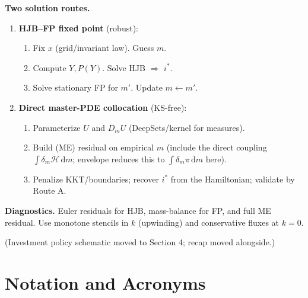 ﻿\documentclass[11pt,letterpaper,oneside]{article}
\numberwithin{equation}{section}
\newcommand{\1}{\mathbf{1}}
\newcommand{\dmU}{D_m U}
\begin{document}
\begin{tcolorbox}[didacticstyle]
\textbf{Two solution routes.}
\begin{enumerate}[leftmargin=1.25em]
\item[\textbf{A.}] \textbf{HJB--FP fixed point} (robust):
\begin{enumerate}[leftmargin=1em,label*=\arabic*.]
\item Fix $x$ (grid/invariant law). Guess $m$.
\item Compute $Y,P(Y)$. Solve HJB $\Rightarrow$ $i^*$.
\item Solve stationary FP for $m'$. Update $m\leftarrow m'$.
\end{enumerate}
\item[\textbf{B.}] \textbf{Direct master-PDE collocation} (KS-free):
\begin{enumerate}[leftmargin=1em,label*=\arabic*.]
\item Parameterize $U$ and $\dmU$ (DeepSets/kernel for measures).
\item Build (ME) residual on empirical $m$ (include the direct coupling $\int \delta_m \mathcal H\,\mathrm dm$; envelope reduces this to $\int \delta_m \pi\,\mathrm dm$ here).
\item Penalize KKT/boundaries; recover $i^*$ from the Hamiltonian; validate by Route A.
\end{enumerate}
\end{enumerate}

\textbf{Diagnostics.} Euler residuals for HJB, mass-balance for FP, and full ME residual. Use monotone stencils in $k$ (upwinding) and conservative fluxes at $k=0$.
\end{tcolorbox}

(Investment policy schematic moved to Section 4; recap moved alongside.)


\clearpage
\newpage
\section{Notation and Acronyms}\label{sec:notation}
\end{document}
